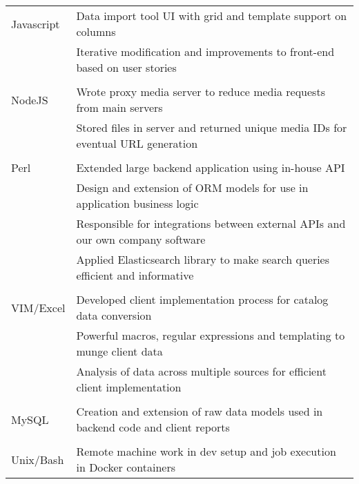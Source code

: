 \documentclass[12pt]{article}
\begin{document}
\begin{description}
\begin{description}
                    \begin{tabular}{l|l}
                        Javascript & Data import tool UI with grid and template support on columns\\
                                   & Iterative modification and improvements to front-end based on user stories\\
                                     \\
                        NodeJS     & Wrote proxy media server to reduce media requests from main servers \\
                                   & Stored files in server and returned unique media IDs for eventual URL generation\\
                                     \\
                        Perl   & Extended large backend application using in-house API \\
                                   & Design and extension of ORM models for use in application business logic \\
                                   & Responsible for integrations between external APIs and our own company software \\
                                   & Applied Elasticsearch library to make search queries efficient and informative\\
                                     \\
                        VIM/Excel  & Developed client implementation process for catalog data conversion\\
                                   & Powerful macros, regular expressions and templating to munge client data\\
                                   & Analysis of data across multiple sources for efficient client implementation\\
                                     \\
                        MySQL      & Creation and extension of raw data models used in backend code and client reports\\
                                     \\
                        Unix/Bash  & Remote machine work in dev setup and job execution in Docker containers\\
                    \end{tabular}

            \end{description}


\end{description}
\end{document}
